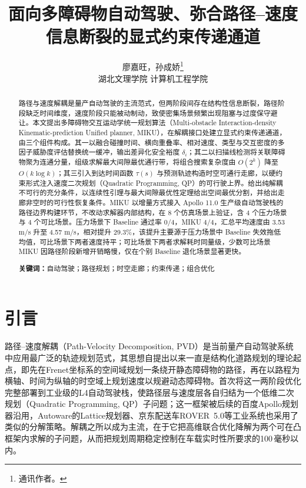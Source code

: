\documentclass[a4paper,11pt]{ctexart}
\title{面向多障碍物自动驾驶、弥合路径--速度信息断裂的显式约束传递通道}
\author{廖嘉旺，孙成娇\thanks{通讯作者。}\\[2pt]\normalsize 湖北文理学院 计算机工程学院}
\date{}
\theoremstyle{definition}
\begin{document}
\maketitle

\begin{abstract}
\noindent
路径与速度解耦是量产自动驾驶的主流范式，但两阶段间存在结构性信息断裂，路径阶段缺乏时间维度，速度阶段只能被动制动，致使密集场景频繁出现阻塞与过度保守避让。本文提出多障碍物交互运动学统一规划算法（Multi-obstacle Interaction-density Kinematic-prediction Unified planner, MIKU），在解耦接口处建立显式约束传递通道，由三个组件构成。其一以融合碰撞时间、横向重叠率、相对速度、类型与交互密度的多因子威胁度评估替换统一缓冲，输出差异化安全裕度 $\delta_i$；其二以扫描线检测将关联障碍物聚为连通分量，组级求解最大间隙最优通行带，将组合搜索复杂度由 $O(2^k)$ 降至 $O(k\log k)$；其三引入到达时间函数 $\tau(s)$ 与预测轨迹构造时空可通行走廊，以硬约束形式注入速度二次规划（Quadratic Programming, QP）的可行驶上界。给出纯解耦不可行的充分条件，以连续性引理与最大间隙最优性定理给出空间最优分割，并给出走廊非空时的可行性恢复条件。MIKU 以增量方式接入 Apollo 11.0 生产级自动驾驶栈的路径边界构建环节，不改动求解器内部结构，在 8 个仿真场景上验证，含 4 个压力场景与 4 个可比场景。压力场景下 Baseline 通过率 0/4，MIKU 4/4，汇总平均速度由 3.53 m/s 升至 4.57 m/s，相对提升 29.3\%，该提升主要源于压力场景中 Baseline 失效拖低均值，可比场景下两者速度持平；可比场景下两者求解耗时同量级，少数可比场景 MIKU 因路径阶段新增开销略慢，仅在个别 Baseline 退化场景显著更快。

\vspace{0.5em}
\noindent\textbf{关键词：}自动驾驶；路径规划；时空走廊；约束传递；组合优化
\end{abstract}
\section{引言}
\label{sec:intro}

路径--速度解耦（Path-Velocity Decomposition, PVD）是当前量产自动驾驶系统中应用最广泛的轨迹规划范式，其思想自\citet{kant1986pvd}提出以来一直是结构化道路规划的理论起点，即先在Frenet坐标系的空间域规划一条绕开静态障碍物的路径，再在以路程为横轴、时间为纵轴的时空域上规划速度以规避动态障碍物。\citet{fan2018baidu}首次将这一两阶段优化完整部署到工业级的L4自动驾驶栈，使路径层与速度层各自归结为一个低维二次规划（Quadratic Programming, QP）子问题；这一框架被后续的百度Apollo规划器\citep{apollo2024}沿用，Autoware的Lattice规划器、京东配送车ROVER~5.0\citep{wang2022_jfr}等工业系统也采用了类似的分解策略。解耦之所以成为主流，在于它把高维联合优化降解为两个可在凸框架内求解的子问题，从而把规划周期稳定控制在车载实时性所要求的100\,毫秒以内\citep{fan2018baidu}。
\end{document}
